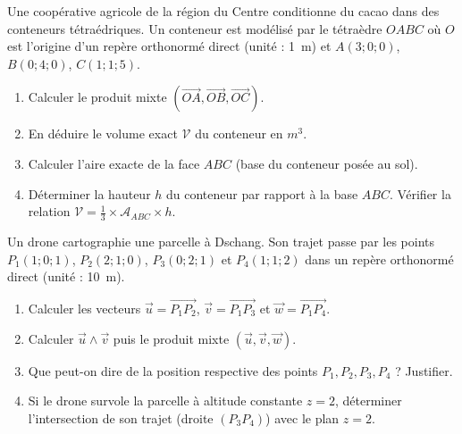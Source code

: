 \documentclass[11pt]{article}
\begin{document}
\begin{exercice}
Une coopérative agricole de la région du Centre conditionne du cacao dans des conteneurs tétraédriques. Un conteneur est modélisé par le tétraèdre $OABC$ où $O$ est l'origine d'un repère orthonormé direct (unité : \SI{1}{m}) et $A(3;0;0)$, $B(0;4;0)$, $C(1;1;5)$.
\begin{enumerate}
    \item Calculer le produit mixte $(\overrightarrow{OA},\overrightarrow{OB},\overrightarrow{OC})$.
    \item En déduire le volume exact $\mathcal V$ du conteneur en $\si{m^3}$.
    \item Calculer l'aire exacte de la face $ABC$ (base du conteneur posée au sol).
    \item Déterminer la hauteur $h$ du conteneur par rapport à la base $ABC$. Vérifier la relation $\mathcal V = \frac13 \times \mathcal A_{ABC} \times h$.
\end{enumerate}
\end{exercice}

\begin{exercice}
Un drone cartographie une parcelle à Dschang. Son trajet passe par les points $P_1(1;0;1)$, $P_2(2;1;0)$, $P_3(0;2;1)$ et $P_4(1;1;2)$ dans un repère orthonormé direct (unité : \SI{10}{m}).
\begin{enumerate}
    \item Calculer les vecteurs $\vec u = \overrightarrow{P_1P_2}$, $\vec v = \overrightarrow{P_1P_3}$ et $\vec w = \overrightarrow{P_1P_4}$.
    \item Calculer $\vec u \wedge \vec v$ puis le produit mixte $(\vec u, \vec v, \vec w)$.
    \item Que peut-on dire de la position respective des points $P_1, P_2, P_3, P_4$ ? Justifier.
    \item Si le drone survole la parcelle à altitude constante $z=2$, déterminer l'intersection de son trajet (droite $(P_3P_4)$) avec le plan $z=2$.
\end{enumerate}
\end{exercice}
\end{document}

